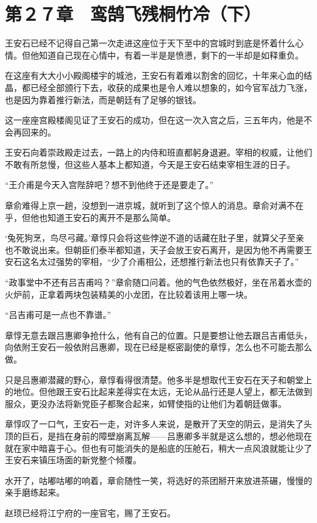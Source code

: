 \section{第２７章　鸾鹄飞残桐竹冷（下）}

王安石已经不记得自己第一次走进这座位于天下至中的宫城时到底是怀着什么心情。但他知道自己现在心情中，有着一半是是愤懑，剩下的一半却是如释重负。

在这座有大大小小殿阁楼宇的城池，王安石有着难以割舍的回忆，十年来心血的结晶，都已经全部颁行下去，收获的成果也是令人难以想象的，如今官军战力飞涨，也是因为靠着推行新法，而是朝廷有了足够的银钱。

这一座座宫殿楼阁见证了王安石的成功，但在这一次入宫之后，三五年内，他是不会再回来的。

王安石向着崇政殿走过去，一路上的内侍和班直都躬身退避。宰相的权威，让他们不敢有所怠慢，但这些人基本上都知道，今天是王安石结束宰相生涯的日子。

“王介甫是今天入宫陛辞吧？想不到他终于还是要走了。”

章俞难得上京一趟，没想到一进京城，就听到了这个惊人的消息。章俞对满不在乎，但他也知道王安石的离开不是那么简单。

‘兔死狗烹，鸟尽弓藏。’章惇只会将这些悖逆不道的话藏在肚子里，就算父子至亲也不敢说出来。但朝臣们泰半都知道，天子会放王安石离开，是因为他不再需要王安石这名太过强势的宰相，“少了介甫相公，还想推行新法也只有依靠天子了。”

“政事堂中不还有吕吉甫吗？”章俞随口问着。他的气色依然极好，坐在吊着水壶的火炉前，正拿着两块包装精美的小龙团，在比较着该用上哪一块。

“吕吉甫可是一点也不靠谱。”

章惇无意去跟吕惠卿争抢什么，他有自己的位置。只是要想让他去跟吕吉甫低头，向依附王安石一般依附吕惠卿，现在已经是枢密副使的章惇，怎么也不可能去那么做。

只是吕惠卿潜藏的野心，章惇看得很清楚。他多半是想取代王安石在天子和朝堂上的地位。但他跟王安石比起来差得实在太远，无论从品行还是人望上，都无法做到服众，更没办法将新党臣子都聚合起来，如臂使指的让他们为着朝廷做事。

章惇叹了一口气，王安石一走，对许多人来说，是散开了天空的阴云，是消失了头顶的巨石，是挡在身前的障壁崩离瓦解——吕惠卿多半就是这么想的，想必他现在就在家中暗喜于心。但也有可能消失的是船底的压舱石，稍大一点风浪就能让少了王安石来镇压场面的新党整个倾覆。

水开了，咕嘟咕嘟的响着，章俞随性一笑，将选好的茶团掰开来放进茶碾，慢慢的亲手磨练起来。

赵顼已经将江宁府的一座官宅，赐了王安石。


